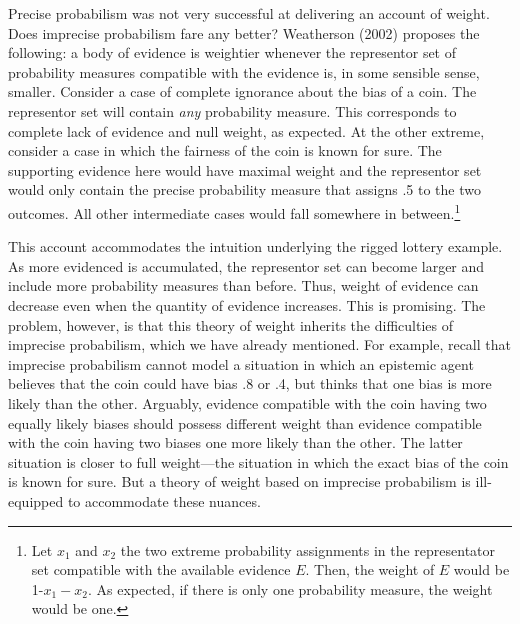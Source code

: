 \documentclass[
  10pt,
  dvipsnames,enabledeprecatedfontcommands]{scrartcl}
\begin{document}
Precise probabilism was not very successful at delivering an account of
weight. Does imprecise probabilism fare any better? Weatherson (2002)
proposes the following: a body of evidence is weightier whenever the
representor set of probability measures compatible with the evidence is,
in some sensible sense, smaller.
 Consider a case of complete
ignorance about the bias of a coin. The representor set will contain
\emph{any} probability measure. This corresponds to complete lack of
evidence and null weight, as expected. At the other extreme, consider a
case in which the fairness of the coin is known for sure. The supporting
evidence here would have maximal weight and the representor set would
only contain the precise probability measure that assigns .5 to the two
outcomes. All other intermediate cases would fall somewhere in
between.\footnote{Let \(x_1\) and \(x_2\) the two extreme probability
  assignments in the representator set compatible with the available
  evidence \(E\). Then, the weight of \(E\) would be 1-\(x_1-x_2\). As
  expected, if there is only one probability measure, the weight would
  be one.}

This account accommodates the intuition underlying the rigged lottery
example. As more evidenced is accumulated, the representor set can
become larger and include more probability measures than before. Thus,
weight of evidence can decrease even when the quantity of evidence
increases. This is promising. The problem, however, is that this theory
of weight inherits the difficulties of imprecise probabilism, which we
have already mentioned. For example, recall that imprecise probabilism
cannot model a situation in which an epistemic agent believes that the
coin could have bias .8 or .4, but thinks that one bias is more likely
than the other. Arguably, evidence compatible with the coin having two
equally likely biases should possess different weight than evidence
compatible with the coin having two biases one more likely than the
other. The latter situation is closer to full weight---the situation in
which the exact bias of the coin is known for sure. But a theory of
weight based on imprecise probabilism is ill-equipped to accommodate
these nuances.

\end{document}
